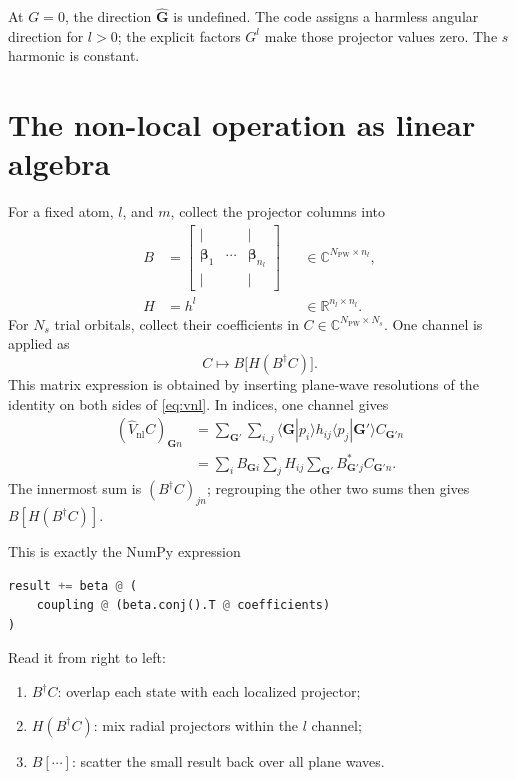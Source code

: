 \documentclass[10pt,twocolumn]{article}
\newcommand{\vnl}{\widehat V_{\mathrm{nl}}}
\newcommand{\gvec}{\mathbf G}
\begin{document}
At \(G=0\), the direction \(\hat{\gvec}\) is undefined.  The code assigns a
harmless angular direction for \(l>0\); the explicit factors
\(G^l\) make those projector values zero.  The \(s\) harmonic is constant.

\section{The non-local operation as linear algebra}

For a fixed atom, \(l\), and \(m\), collect the projector columns into
\begin{equation}
\begin{aligned}
B&=
\begin{bmatrix}
\vert&&\vert\\
\bm\beta_1&\cdots&\bm\beta_{n_l}\\
\vert&&\vert
\end{bmatrix}
&&\in\mathbb C^{N_{\mathrm{PW}}\times n_l},\\
H&=h^l
&&\in\mathbb R^{n_l\times n_l}.
\end{aligned}
\end{equation}
For \(N_s\) trial orbitals, collect their coefficients in
\(C\in\mathbb C^{N_{\mathrm{PW}}\times N_s}\).  One channel is applied as
\begin{equation}
\boxed{\quad C\longmapsto B\big[H(B^\dagger C)\big].\quad}
\label{eq:bhb}
\end{equation}
This matrix expression is obtained by inserting plane-wave resolutions of the
identity on both sides of \cref{eq:vnl}.  In indices, one channel gives
\begin{align}
(\vnl C)_{\gvec n}
&=\sum_{\gvec'}\sum_{i,j}
\langle\gvec|p_i\rangle h_{ij}
\langle p_j|\gvec'\rangle C_{\gvec'n}\nonumber\\
&=\sum_i B_{\gvec i}\sum_jH_{ij}
\sum_{\gvec'}B_{\gvec'j}^*C_{\gvec'n}.
\end{align}
The innermost sum is \((B^\dagger C)_{jn}\); regrouping the other two sums
then gives \(B[H(B^\dagger C)]\).

This is exactly the NumPy expression
\begin{lstlisting}[language=Python]
result += beta @ (
    coupling @ (beta.conj().T @ coefficients)
)
\end{lstlisting}
Read it from right to left:
\begin{enumerate}
  \item \(B^\dagger C\): overlap each state with each localized projector;
  \item \(H(B^\dagger C)\): mix radial projectors within the \(l\) channel;
  \item \(B[\cdots]\): scatter the small result back over all plane waves.
\end{enumerate}
\end{document}

